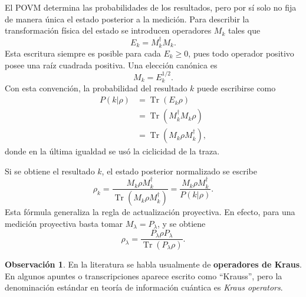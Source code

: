 \documentclass[12pt,a4paper]{article}
\theoremstyle{definition}
\newtheorem{observacion}[definicion]{Observación}
\theoremstyle{plain}
\theoremstyle{remark}
\begin{document}
El POVM determina las probabilidades de los resultados, pero por sí solo no fija de manera única el estado posterior a la medición. Para describir la transformación física del estado se introducen operadores $M_k$ tales que
\begin{equation*}
    E_k=M_k^\dagger M_k.
\end{equation*}
Esta escritura siempre es posible para cada $E_k\geq0$, pues todo operador positivo posee una raíz cuadrada positiva. Una elección canónica es
\begin{equation*}
    M_k=E_k^{1/2}.
\end{equation*}
Con esta convención, la probabilidad del resultado $k$ puede escribirse como
\begin{align*}
    P(k|\rho)
    &=\operatorname{Tr}(E_k\rho)\\
    &=\operatorname{Tr}(M_k^\dagger M_k\rho)\\
    &=\operatorname{Tr}(M_k\rho M_k^\dagger),
\end{align*}
donde en la última igualdad se usó la ciclicidad de la traza.

Si se obtiene el resultado $k$, el estado posterior normalizado se escribe
\begin{equation*}
    \rho_k=
    \frac{M_k\rho M_k^\dagger}
    {\operatorname{Tr}(M_k\rho M_k^\dagger)}
    =
    \frac{M_k\rho M_k^\dagger}{P(k|\rho)}.
\end{equation*}
Esta fórmula generaliza la regla de actualización proyectiva. En efecto, para una medición proyectiva basta tomar $M_\lambda=P_\lambda$, y se obtiene
\begin{equation*}
    \rho_\lambda=
    \frac{P_\lambda\rho P_\lambda}
    {\operatorname{Tr}(P_\lambda\rho)}.
\end{equation*}

\begin{observacion}
En la literatura se habla usualmente de \textbf{operadores de Kraus}. En algunos apuntes o transcripciones aparece escrito como ``Krauss'', pero la denominación estándar en teoría de información cuántica es \emph{Kraus operators}.
\end{observacion}
\end{document}
